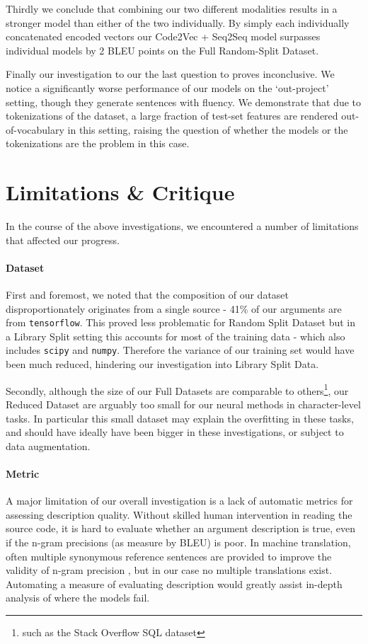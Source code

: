Thirdly we conclude that combining our two different modalities results in a stronger model than either of the two individually. By simply each individually concatenated encoded vectors our Code2Vec + Seq2Seq model surpasses individual models by 2 BLEU points on the Full Random-Split Dataset.

Finally our investigation to our the last question to proves inconclusive. We notice a significantly worse performance of our models on the `out-project' setting, though they generate sentences with fluency. We demonstrate that due to tokenizations of the dataset, a large fraction of test-set features are rendered out-of-vocabulary in this setting, raising the question of whether the models or the tokenizations are the problem in this case. 

\section{Limitations \& Critique}

In the course of the above investigations, we encountered a number of limitations that affected our progress.

\paragraph{Dataset} 
First and foremost, we noted that the composition of our dataset disproportionately originates from a single source - 41\% of our arguments are from \texttt{tensorflow}. This proved less problematic for Random Split Dataset but in a Library Split setting this accounts for most of the training data - which also includes \texttt{scipy} and \texttt{numpy}. Therefore the variance of our training set would have been much reduced, hindering our investigation into Library Split Data.

Secondly, although the size of our Full Datasets are comparable to others\footnote{such as the Stack Overflow SQL dataset}, our Reduced Dataset are arguably too small for our neural methods in character-level tasks. In particular this small dataset may explain the overfitting in these tasks, and should have ideally have been bigger in these investigations, or subject to data augmentation.

\paragraph{Metric} 
A major limitation of our overall investigation is a lack of automatic metrics for assessing description quality. Without skilled human intervention in reading the source code, it is hard to evaluate whether an argument description is true, even if the n-gram precisions (as measure by BLEU) is poor. In machine translation, often multiple synonymous reference sentences are provided to improve the validity of n-gram precision \citep{papineni_bleu_2001}, but in our case no multiple translations exist. Automating a measure of evaluating description would greatly assist in-depth analysis of where the models fail.

